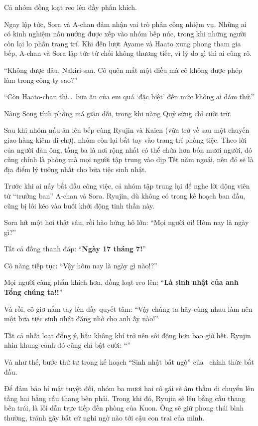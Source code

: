 \documentclass[../main.tex]{subfiles}
\begin{document}
Cả nhóm đồng loạt reo lên đầy phấn khích.

Ngay lập tức, Sora và A-chan đảm nhận vai trò phân công nhiệm vụ. Những ai có kinh nghiệm nấu nướng được xếp vào nhóm bếp núc, trong khi những người còn lại lo phần trang trí. Khi đến lượt Ayame và Haato xung phong tham gia bếp, A-chan và Sora lập tức từ chối không thương tiếc, vì lý do gì thì ai cũng rõ.

``Không được đâu, Nakiri-san. Cô quên mất một điều mà cô không được phép làm trong công ty sao?''

``Còn Haato-chan thì\dots\ bữa ăn của em quá `đặc biệt' đến mức không ai dám thử.''

Nàng Song tính phồng má giận dỗi, trong khi nàng Quỷ sừng chỉ cười trừ.

Sau khi nhóm nấu ăn lên bếp cùng Ryujin và Kaien (vừa trở về sau một chuyến giao hàng kiêm đi chợ), nhóm còn lại bắt tay vào trang trí phòng tiệc. Theo lời của người đàn ông, tầng ba là nơi rộng nhất có thể chứa hơn bốn mươi người, đó cũng chính là phòng mà mọi người tập trung vào dịp Tết năm ngoái, nên đó sẽ là địa điểm lý tưởng nhất cho bữa tiệc sinh nhật.

Trước khi ai nấy bắt đầu công việc, cả nhóm tập trung lại để nghe lời động viên từ ``trưởng ban'' A-chan và Sora. Ryujin, dù không có trong kế hoạch ban đầu, cũng bị lôi kéo vào buổi khởi động tinh thần này.

Sora hít một hơi thật sâu, rồi hào hứng hô lớn: ``Mọi người ơi! Hôm nay là ngày gì?''

Tất cả đồng thanh đáp: ``\textbf{Ngày 17 tháng 7!}''

Cô nàng tiếp tục: ``Vậy hôm nay là ngày gì nào!?''

Mọi người càng phấn khích hơn, đồng loạt reo lên: ``\textbf{Là sinh nhật của anh Tổng chúng ta!!}''

Và rồi, cô giơ nắm tay lên đầy quyết tâm: ``Vậy chúng ta hãy cùng nhau làm nên một bữa tiệc sinh nhật đáng nhớ cho anh ấy nào!''

Tất cả nhất loạt đồng ý, bầu không khí trở nên sôi động hơn bao giờ hết. Ryujin nhìn khung cảnh đó cũng chỉ bật cười: ``''

Và như thế, bước thứ tư trong kế hoạch ``Sinh nhật bất ngờ'' của \hll\ chính thức bắt đầu.

\ct

Để đảm bảo bí mật tuyệt đối, nhóm ba mươi hai cô gái sẽ âm thầm di chuyển lên tầng hai bằng cầu thang bên phải. Trong khi đó, Ryujin sẽ lên bằng cầu thang bên trái, là lối dẫn trực tiếp đến phòng của Kuon. Ông sẽ giữ phong thái bình thường, tránh gây bất cứ nghi ngờ nào tới cậu con trai của mình.
\end{document}
